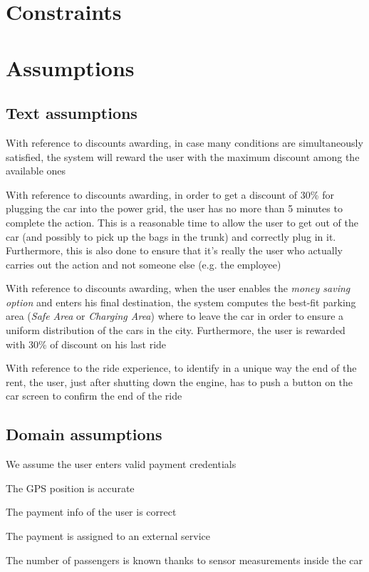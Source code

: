 \documentclass[11pt,a4paper]{report}
\begin{document}
\section{Constraints}
\section{Assumptions}
\subsection{Text assumptions}
\begin{TA}
	\item With reference to discounts awarding, in case many conditions are simultaneously satisfied, the system will reward the user with the maximum discount among the available ones
	\item With reference to discounts awarding, in order to get a discount of 30\% for plugging the car into the power grid, the user has no more than 5 minutes to complete the action. This is a reasonable time to allow the user to get out of the car (and possibly to pick up the bags in the trunk) and correctly plug in it. Furthermore, this is also done to ensure that it's really the user who actually carries out the action and not someone else (e.g. the employee)
	\item With reference to discounts awarding, when the user enables the \textit{money saving option} and enters his final destination, the system computes the best-fit parking area (\textit{Safe Area} or \textit{Charging Area}) where to leave the car in order to ensure a uniform distribution of the cars in the city. Furthermore, the user is rewarded with 30\% of discount on his last ride
	\item With reference to the ride experience, to identify in a unique way the end of the rent, the user, just after shutting down the engine, has to push a button on the car screen to confirm the end of the ride
\end{TA}
\subsection{Domain assumptions}
\begin{DA}
	\item We assume the user enters valid payment credentials
	\item The GPS position is accurate
	\item The payment info of the user is correct
	\item The payment is assigned to an external service
	\item The number of passengers is known thanks to sensor measurements inside the car
\end{DA}
\end{document}
